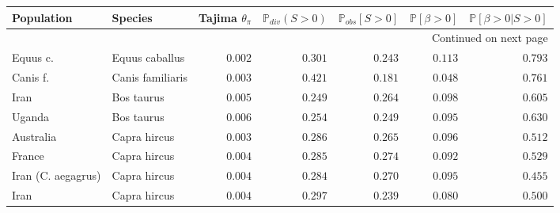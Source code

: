 \documentclass{article}
\begin{document}
    \begin{center}
        \begin{longtable}{|l|l|r|r|r|r|r|}
            \toprule
            Population           & Species             & Tajima $\theta_{\pi}$ & $\mathbb{P}_{div}(S > 0)$ & $\mathbb{P}_{obs}[S>0]$ & $\mathbb{P} [ \beta > 0 ]$ & $\mathbb{P} [ \beta > 0  | S>0]$ \\
            \midrule
            \endhead
            \midrule
            \multicolumn{7}{r}{{Continued on next page}} \\
            \midrule
            \endfoot

            \bottomrule
            \endlastfoot
            Equus c.             & Equus caballus      & $ 0.002$              & $ 0.301$                  & $ 0.243$                & $ 0.113$                   & $ 0.793$                       \\
            Canis f.             & Canis familiaris    & $ 0.003$              & $ 0.421$                  & $ 0.181$                & $ 0.048$                   & $ 0.761$                       \\
            Iran                 & Bos taurus          & $ 0.005$              & $ 0.249$                  & $ 0.264$                & $ 0.098$                   & $ 0.605$                       \\
            Uganda               & Bos taurus          & $ 0.006$              & $ 0.254$                  & $ 0.249$                & $ 0.095$                   & $ 0.630$                       \\
            Australia            & Capra hircus        & $ 0.003$              & $ 0.286$                  & $ 0.265$                & $ 0.096$                   & $ 0.512$                       \\
            France               & Capra hircus        & $ 0.004$              & $ 0.285$                  & $ 0.274$                & $ 0.092$                   & $ 0.529$                       \\
            Iran (C. aegagrus)   & Capra hircus        & $ 0.004$              & $ 0.284$                  & $ 0.270$                & $ 0.095$                   & $ 0.455$                       \\
            Iran                 & Capra hircus        & $ 0.004$              & $ 0.297$                  & $ 0.239$                & $ 0.080$                   & $ 0.500$                       \\

\end{longtable}
\end{center}
\end{document}
